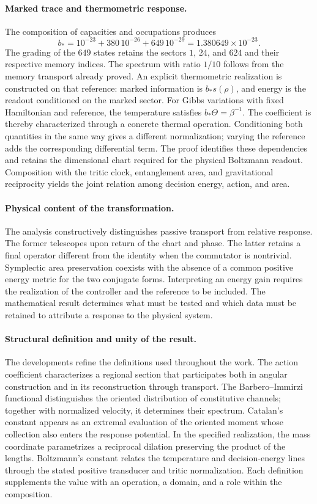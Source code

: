 \newpage
\paragraph{Marked trace and thermometric response.}
The composition of capacities and occupations produces
\[
 b_*=10^{-23}+380\,10^{-26}+649\,10^{-29}
     =1.380649\times10^{-23}.
\]
The grading of the $649$ states retains the sectors $1$, $24$,
and $624$ and their respective memory indices. The spectrum with
ratio $1/10$ follows from the memory transport already proved.
An explicit thermometric realization is constructed on that reference:
marked information is $b_*s(\rho)$, and energy is the readout
conditioned on the marked sector. For Gibbs variations with fixed
Hamiltonian and reference, the temperature satisfies
$b_*\Theta=\beta^{-1}$. The coefficient is thereby characterized
through a concrete thermal operation. Conditioning both quantities
in the same way gives a different normalization; varying the reference
adds the corresponding differential term. The proof identifies these
dependencies and retains the dimensional chart required for the
physical Boltzmann readout. Composition with the tritic clock,
entanglement area, and gravitational reciprocity yields the joint
relation among decision energy, action, and area.

\paragraph{Physical content of the transformation.}
The analysis constructively distinguishes passive transport from
relative response. The former telescopes upon return of the chart and
phase. The latter retains a final operator different from the identity
when the commutator is nontrivial. Symplectic area preservation coexists
with the absence of a common positive energy metric for the two
conjugate forms. Interpreting an energy gain requires the realization of
the controller and the reference to be included. The mathematical result
determines what must be tested and which data must be retained to
attribute a response to the physical system.

\paragraph{Structural definition and unity of the result.}
The developments refine the definitions used throughout the work. The
action coefficient characterizes a regional section that participates
both in angular construction and in its reconstruction through
transport. The Barbero--Immirzi functional distinguishes the oriented
distribution of constitutive channels; together with normalized
velocity, it determines their spectrum. Catalan's constant appears as
an extremal evaluation of the oriented moment whose collection also enters
the response potential. In the specified realization, the mass
coordinate parametrizes a reciprocal dilation preserving the product
of the lengths. Boltzmann's constant relates the temperature and
decision-energy lines through the stated positive transducer and tritic
normalization. Each definition supplements the value with an operation,
a domain, and a role within the composition.

